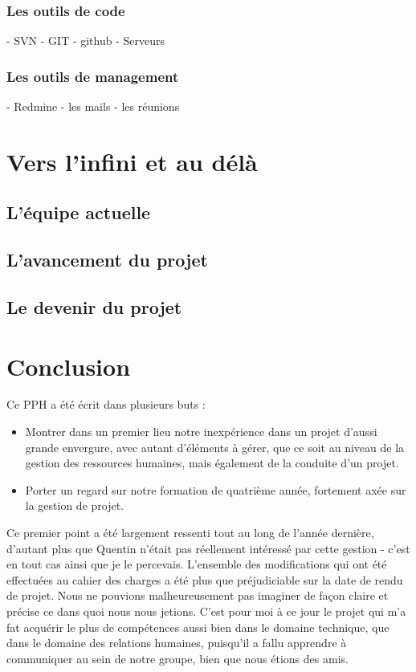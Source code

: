 \documentclass{article}
\begin{document}
\subsubsection{Les outils de code}
- SVN
- GIT - github
- Serveurs
\subsubsection{Les outils de management}
- Redmine
- les mails
- les réunions

\section{Vers l'infini et au délà}
	\subsection{L'équipe actuelle}
	\subsection{L'avancement du projet}
	\subsection{Le devenir du projet}
\section{Conclusion}

		Ce PPH a été écrit dans plusieurs buts : 
		\begin{itemize}
			\item Montrer dans un premier lieu notre inexpérience dans un projet d'aussi grande envergure, avec autant d'éléments à gérer, que ce soit au niveau de la gestion des ressources humaines, mais également de la conduite d'un projet.
			\item Porter un regard sur notre formation de quatrième année, fortement axée sur la gestion de projet. 
		\end{itemize}
		
		Ce premier point a été largement ressenti tout au long de l'année dernière, d'autant plus que Quentin n'était pas réellement intéressé par cette gestion - c'est en tout cas ainsi que je le percevais. L'ensemble des modifications qui ont été effectuées au cahier des charges a été plus que préjudiciable sur la date de rendu de projet. Nous ne pouvions malheureusement pas imaginer de façon claire et précise ce dans quoi nous nous jetions. C'est pour moi à ce jour le projet qui m'a fat acquérir le plus de compétences aussi bien dans le domaine technique, que dans le domaine des relations humaines, puisqu'il a fallu apprendre à communiquer au sein de notre groupe, bien que nous étions des amis. 
		
\end{document}
